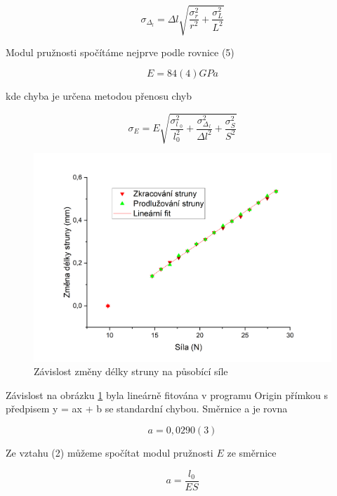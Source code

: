 \begin{equation}
    \sigma_\Delta_l = \Delta l \sqrt{\frac{\sigma^2_r}{r^2}+\frac{\sigma^2_L}{L^2}}
\end{equation}

Modul pružnosti spočítáme nejprve podle rovnice (5)

\begin{equation}
    \nonumber
    E = 84(4) GPa
\end{equation}

kde chyba je určena metodou přenosu chyb

\begin{equation}
    \sigma_E = E \sqrt{\frac{\sigma^2_l__0}{l^2_0}+\frac{\sigma^2_\Delta__l}{\Delta l^2}+\frac{\sigma^2_S}{S^2}}
\end{equation}

\begin{figure}[h]
    \centering
    \includegraphics[width=0.85\linewidth]{09 - Měření modulu pružnosti v tahu//Protokol_modul pružnosti//img/Změna délky struny.png}
    \caption{Závislost změny délky struny na působící síle}
    \label{fig:delka-struny}
\end{figure}

Závislost na obrázku \ref{fig:delka-struny} byla lineárně fitována v programu Origin přímkou s předpisem y = ax + b se standardní chybou. Směrnice a je rovna

\begin{equation}
    \nonumber
    a = 0,0290(3)
\end{equation}

Ze vztahu (2) můžeme spočítat modul pružnosti \(E\) ze směrnice

\begin{equation}
    \nonumber
    a = \frac{l_0}{ES}
\end{equation}

